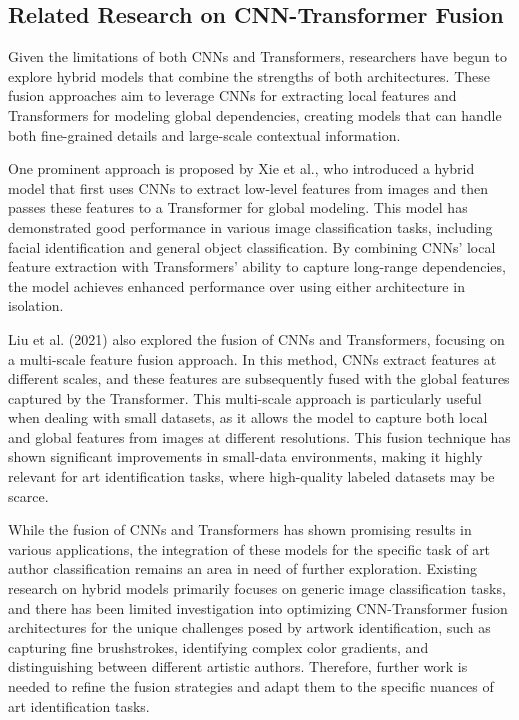 \subsection{Related Research on CNN-Transformer Fusion}

Given the limitations of both CNNs and Transformers, researchers have begun to explore hybrid models that combine the strengths of both architectures. These fusion approaches aim to leverage CNNs for extracting local features and Transformers for modeling global dependencies, creating models that can handle both fine-grained details and large-scale contextual information.

One prominent approach is proposed by Xie et al., who introduced a hybrid model \cite{arshad2024hybrid}that first uses CNNs to extract low-level features from images and then passes these features to a Transformer for global modeling. This model has demonstrated good performance in various image classification tasks, including facial identification and general object classification. By combining CNNs' local feature extraction with Transformers' ability to capture long-range dependencies, the model achieves enhanced performance over using either architecture in isolation.

Liu et al. (2021) also explored the fusion of CNNs and Transformers, focusing on a multi-scale feature fusion approach. In this method, CNNs extract features at different scales, and these features are subsequently fused with the global features captured by the Transformer. This multi-scale approach is particularly useful when dealing with small datasets, as it allows the model to capture both local and global features from images at different resolutions. This fusion technique has shown significant improvements in small-data environments, making it highly relevant for art identification tasks, where high-quality labeled datasets may be scarce.

While the fusion of CNNs and Transformers has shown promising results in various applications, the integration of these models for the specific task of art author classification remains an area in need of further exploration. Existing research on hybrid models primarily focuses on generic image classification tasks, and there has been limited investigation into optimizing CNN-Transformer fusion architectures for the unique challenges posed by artwork identification, such as capturing fine brushstrokes, identifying complex color gradients, and distinguishing between different artistic authors. Therefore, further work is needed to refine the fusion strategies and adapt them to the specific nuances of art identification tasks.